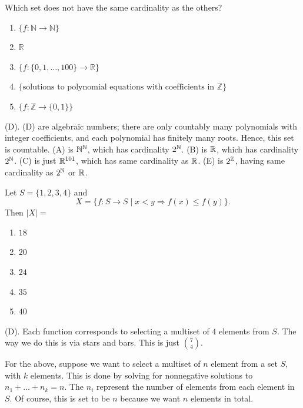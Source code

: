 \begin{exercise}
Which set does not have the same cardinality as the others?
\begin{enumerate}[label=(\Alph*)]
    \item $\{f:\mathbb{N}\to\mathbb{N}\}$
    \item $\mathbb{R}$
    \item $\{f:\{0,1,\ldots,100\}\to\mathbb{R}\}$
    \item $\{\text{solutions to polynomial equations with coefficients in }\mathbb{Z}\}$
    \item $\{f:\mathbb{Z}\to\{0,1\}\}$
\end{enumerate}
\end{exercise}
\begin{solution}
(D). (D) are algebraic numbers; there are only countably many polynomials with integer coefficients, 
and each polynomial has finitely many roots. Hence, this set is countable. 
(A) is $\mathbb{N}^{\mathbb{N}}$, which has cardinality $2^{\mathbb{N}}$. (B) is $\mathbb{R}$, which has cardinality $2^{\mathbb{N}}$.
(C) is just $\mathbb{R}^{101}$, which has same cardinality as $\mathbb{R}$. (E) is $2^{\mathbb{Z}}$, having same cardinality as
$2^{\mathbb{N}}$ or $\mathbb{R}$.
\end{solution}

\begin{exercise}
Let $S=\{1,2,3,4\}$ and
\[
X=\{f:S\to S\mid x<y\Rightarrow f(x)\leq f(y)\}.
\]
Then $|X|=$
\begin{enumerate}[label=(\Alph*)]
    \item $18$
    \item $20$
    \item $24$
    \item $35$
    \item $40$
\end{enumerate}
\end{exercise}
\begin{solution}
(D). Each function corresponds to selecting a multiset of $4$ elements from $S$.
The way we do this is via stars and bars. This is just $\binom{7}{4}$.
\end{solution}

\begin{remark}
For the above, suppose we want to select a multiset of $n$ element from a set $S$, with $k$
elements. This is done by solving for nonnegative solutions to $n_1 + \dots + n_k = n$.
The $n_i$ represent the number of elements from each element in $S$. Of course, this is set to 
be $n$ because we want $n$ elements in total.
\end{remark}


